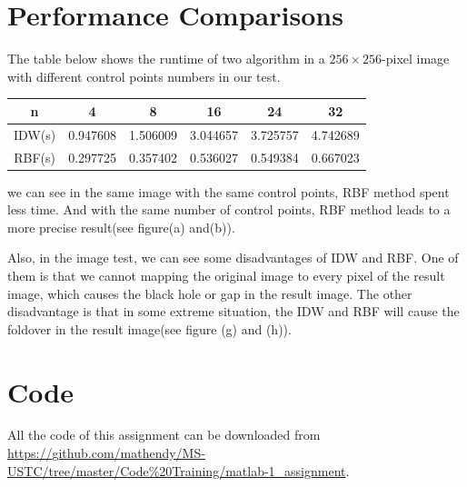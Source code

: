 \documentclass[12pt]{article}
\begin{document}
\section{Performance Comparisons}
The table below shows the runtime of two algorithm in a $256\times256$-pixel image with different control points numbers in our test.
\begin{table}[H]
    \centering
    \begin{tabular}{|c|ccccc|}
        \hline
        n      & 4        & 8        & 16       & 24       & 32       \\
        \hline
        IDW(s) & 0.947608 & 1.506009 & 3.044657 & 3.725757 & 4.742689 \\
        RBF(s) & 0.297725 & 0.357402 & 0.536027 & 0.549384 & 0.667023 \\
        \hline
    \end{tabular}
\end{table}
we can see in the same image with the same control points, RBF method spent less time. And with the same number of control points, RBF method leads to a more precise result(see figure(a) and(b)).

Also, in the image test, we can see some disadvantages of IDW and RBF. One of them is that we cannot mapping the original image to every pixel of the result image, which causes the black hole or gap in the result image. The other disadvantage is that in some extreme situation, the IDW and RBF will cause the foldover in the result image(see figure (g) and (h)).


\appendix
\section{Code}
All the code of this assignment can be downloaded from \url{https://github.com/mathendy/MS-USTC/tree/master/Code%20Training/matlab-1_assignment}.
\end{document}
